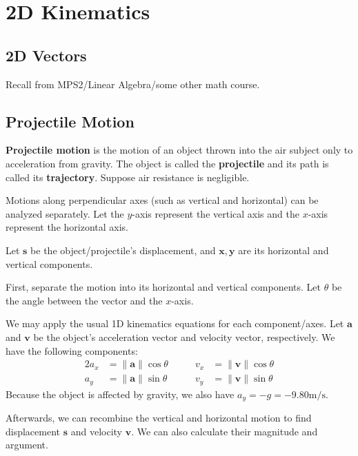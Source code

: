 \documentclass{article}
\begin{document}
\section{2D Kinematics}

\subsection{2D Vectors}

Recall from MPS2/Linear Algebra/some other math course.

\subsection{Projectile Motion}

\textbf{Projectile motion} is the motion of an object thrown into the air subject only to acceleration from gravity. The object is called the \textbf{projectile} and its path is called its \textbf{trajectory}. Suppose air resistance is negligible.

Motions along perpendicular axes (such as vertical and horizontal) can be analyzed separately. Let the $y$-axis represent the vertical axis and the $x$-axis represent the horizontal axis.

Let $\mathbf{s}$ be the object/projectile's displacement, and $\mathbf{x},\mathbf{y}$ are its horizontal and vertical components.

First, separate the motion into its horizontal and vertical components. Let $\theta$ be the angle between the vector and the $x$-axis.

We may apply the usual 1D kinematics equations for each component/axes. Let $\mathbf{a}$ and $\mathbf{v}$ be the object's acceleration vector and velocity vector, respectively. We have the following components:
\begin{alignat*}{2}
	a_x&=\lVert \mathbf{a} \rVert \cos \theta & \qquad 
	v_x&=\lVert \mathbf{v} \rVert \cos \theta \\
	a_y&=\lVert \mathbf{a} \rVert \sin \theta & \qquad 
	v_y&=\lVert \mathbf{v} \rVert \sin \theta
\end{alignat*}
Because the object is affected by gravity, we also have $a_y=-g=-9.80\si{\meter\per\second}$.

Afterwards, we can recombine the vertical and horizontal motion to find displacement $\mathbf{s}$ and velocity $\mathbf{v}$. We can also calculate their magnitude and argument.
\end{document}
